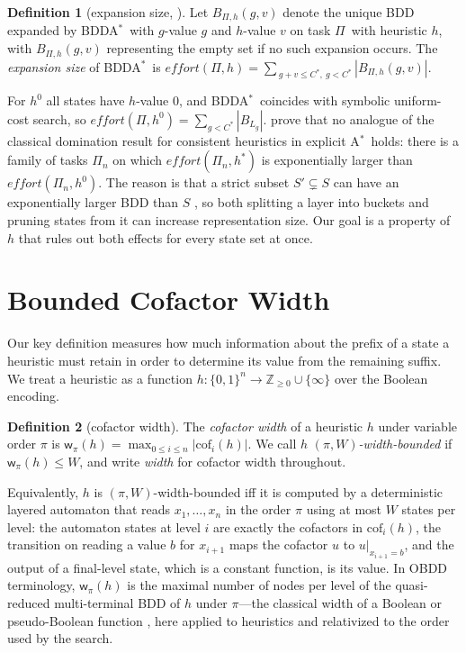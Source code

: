 \documentclass[letterpaper]{article}
\newcommand{\task}{\ensuremath{\Pi}}
\newcommand{\hstar}{\ensuremath{h^{*}}}
\newcommand{\hblind}{\ensuremath{h^{0}}}
\newcommand{\copt}{\ensuremath{C^{*}}}
\newcommand{\bddsize}[1]{\ensuremath{|B_{#1}|}}
\newcommand{\width}{\ensuremath{\mathsf{w}}}
\newcommand{\effort}{\ensuremath{\mathit{effort}}}
\newcommand{\sub}[2]{\ensuremath{\mathrm{cof}_{#1}(#2)}}
\newcommand{\bddastar}{BDDA\ensuremath{^{*}}}
\newcommand{\astar}{A\ensuremath{^{*}}}
\theoremstyle{plain}
\theoremstyle{definition}
\newtheorem{definition}{Definition}
\theoremstyle{remark}
\begin{document}
\begin{definition}[expansion size, \citealp{speck-et-al-icaps2020}]
\label{def-effort}
Let $B_{\task,h}(g,v)$ denote the unique BDD expanded by \bddastar\ with
$g$-value $g$ and $h$-value $v$ on task \task\ with heuristic $h$, with
$B_{\task,h}(g,v)$ representing the empty set if no such expansion
occurs. The \emph{expansion size} of \bddastar\ is
$\effort(\task,h) = \sum_{\,g + v \leq \copt,\ g < \copt}
|B_{\task,h}(g,v)|$.
\end{definition}

For $\hblind$ all states have $h$-value $0$, and \bddastar\ coincides
with symbolic uniform-cost search, so
$\effort(\task,\hblind) = \sum_{g < \copt} \bddsize{L_g}$.
\citet{speck-et-al-icaps2020} prove that no analogue of the classical
domination result for consistent heuristics in explicit \astar\ holds:
there is a family of tasks $\task_n$ on which
$\effort(\task_n, \hstar)$ is exponentially larger than
$\effort(\task_n, \hblind)$. The reason is that a strict subset
$S' \subsetneq S$ can have an exponentially larger BDD than $S$
\citep{torralba-phd2015,speck-et-al-icaps2020}, so both splitting a
layer into buckets and pruning states from it can increase
representation size. Our goal is a property of $h$ that rules out both
effects for every state set at once.

\section{Bounded Cofactor Width}

Our key definition measures how much information about the prefix of a
state a heuristic must retain in order to determine its value from the
remaining suffix. We treat a heuristic as a function
$h \colon \{0,1\}^n \to \mathbb{Z}_{\geq 0} \cup \{\infty\}$ over the
Boolean encoding.

\begin{definition}[cofactor width]
\label{def-width}
The \emph{cofactor width} of a heuristic $h$ under variable order $\pi$
is $\width_\pi(h) = \max_{0 \leq i \leq n} |\sub{i}{h}|$. We call $h$
\emph{$(\pi,W)$-width-bounded} if $\width_\pi(h) \leq W$, and write
\emph{width} for cofactor width throughout.
\end{definition}

Equivalently, $h$ is $(\pi,W)$-width-bounded iff it is computed by a
deterministic layered automaton that reads $x_1, \dots, x_n$ in the order
$\pi$ using at most $W$ states per level: the automaton states at level
$i$ are exactly the cofactors in $\sub{i}{h}$, the transition on reading
a value $b$ for $x_{i+1}$ maps the cofactor $u$ to $u|_{x_{i+1} = b}$,
and the output of a final-level state, which is a constant function, is
its value. In OBDD terminology, $\width_\pi(h)$ is the maximal number of
nodes per level of the quasi-reduced multi-terminal BDD of $h$ under
$\pi$---the classical width of a Boolean or pseudo-Boolean function
\citep{wegener-2000}, here applied to heuristics and relativized to the
order used by the search.
\end{document}
